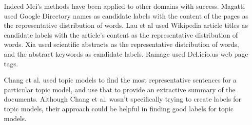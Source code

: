 Indeed Mei's methods have been applied to other domains with success.  Magatti \cite{magatti2009automatic} used Google Directory names as candidate labels with the content of the pages as the representative distribution of words.  Lau et al \cite{lau2011automatic} used Wikipedia article titles as candidate labels with the article’s content as the representative distribution of words.  Xia \cite{wang2010probabilistic} used scientific abstracts as the representative distribution of words, and the abstract keywords as candidate labels.  Ramage \cite{ramage2009labeled} used Del.icio.us web page tags.

Chang et al. \cite{chang2009latent} used topic models to find the most representative sentences for a particular topic model, and use that to provide an extractive summary of the documents.  Although Chang et al. wasn’t specifically trying to create labels for topic models, their approach could be helpful in finding good labels for topic models.  